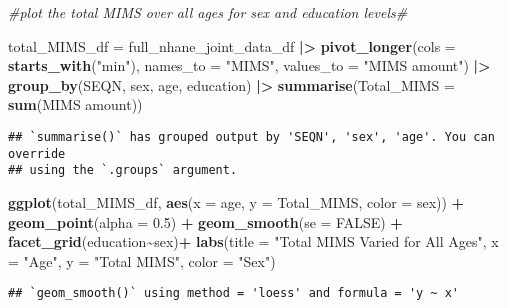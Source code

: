 \documentclass[
]{article}
\newenvironment{Shaded}{\begin{snugshade}}{\end{snugshade}}
\newcommand{\AttributeTok}[1]{\textcolor[rgb]{0.13,0.29,0.53}{#1}}
\newcommand{\CommentTok}[1]{\textcolor[rgb]{0.56,0.35,0.01}{\textit{#1}}}
\newcommand{\ConstantTok}[1]{\textcolor[rgb]{0.56,0.35,0.01}{#1}}
\newcommand{\FloatTok}[1]{\textcolor[rgb]{0.00,0.00,0.81}{#1}}
\newcommand{\FunctionTok}[1]{\textcolor[rgb]{0.13,0.29,0.53}{\textbf{#1}}}
\newcommand{\NormalTok}[1]{#1}
\newcommand{\OtherTok}[1]{\textcolor[rgb]{0.56,0.35,0.01}{#1}}
\newcommand{\SpecialCharTok}[1]{\textcolor[rgb]{0.81,0.36,0.00}{\textbf{#1}}}
\newcommand{\StringTok}[1]{\textcolor[rgb]{0.31,0.60,0.02}{#1}}
\begin{document}
\begin{Shaded}
\begin{Highlighting}[]
\CommentTok{\#plot the total MIMS over all ages for sex and education levels\#}

\NormalTok{total\_MIMS\_df }\OtherTok{=}\NormalTok{ full\_nhane\_joint\_data\_df }\SpecialCharTok{|\textgreater{}} \FunctionTok{pivot\_longer}\NormalTok{(}\AttributeTok{cols =} \FunctionTok{starts\_with}\NormalTok{(}\StringTok{"min"}\NormalTok{), }
                                                        \AttributeTok{names\_to =} \StringTok{"MIMS"}\NormalTok{, }\AttributeTok{values\_to =} \StringTok{"MIMS amount"}\NormalTok{) }\SpecialCharTok{|\textgreater{}}
  \FunctionTok{group\_by}\NormalTok{(SEQN, sex, age, education) }\SpecialCharTok{|\textgreater{}} \FunctionTok{summarise}\NormalTok{(}\AttributeTok{Total\_MIMS =} \FunctionTok{sum}\NormalTok{(}\StringTok{\textasciigrave{}}\AttributeTok{MIMS amount}\StringTok{\textasciigrave{}}\NormalTok{))}
\end{Highlighting}
\end{Shaded}

\begin{verbatim}
## `summarise()` has grouped output by 'SEQN', 'sex', 'age'. You can override
## using the `.groups` argument.
\end{verbatim}

\begin{Shaded}
\begin{Highlighting}[]
\FunctionTok{ggplot}\NormalTok{(total\_MIMS\_df, }\FunctionTok{aes}\NormalTok{(}\AttributeTok{x =}\NormalTok{ age, }\AttributeTok{y =}\NormalTok{ Total\_MIMS, }\AttributeTok{color =}\NormalTok{ sex)) }\SpecialCharTok{+} \FunctionTok{geom\_point}\NormalTok{(}\AttributeTok{alpha =} \FloatTok{0.5}\NormalTok{) }\SpecialCharTok{+}
  \FunctionTok{geom\_smooth}\NormalTok{(}\AttributeTok{se =} \ConstantTok{FALSE}\NormalTok{) }\SpecialCharTok{+} \FunctionTok{facet\_grid}\NormalTok{(education}\SpecialCharTok{\textasciitilde{}}\NormalTok{sex)}\SpecialCharTok{+} \FunctionTok{labs}\NormalTok{(}\AttributeTok{title =} \StringTok{"Total MIMS Varied for All Ages"}\NormalTok{, }\AttributeTok{x =} \StringTok{"Age"}\NormalTok{, }\AttributeTok{y =} \StringTok{"Total MIMS"}\NormalTok{, }\AttributeTok{color =} \StringTok{"Sex"}\NormalTok{)}
\end{Highlighting}
\end{Shaded}

\begin{verbatim}
## `geom_smooth()` using method = 'loess' and formula = 'y ~ x'
\end{verbatim}
\end{document}
